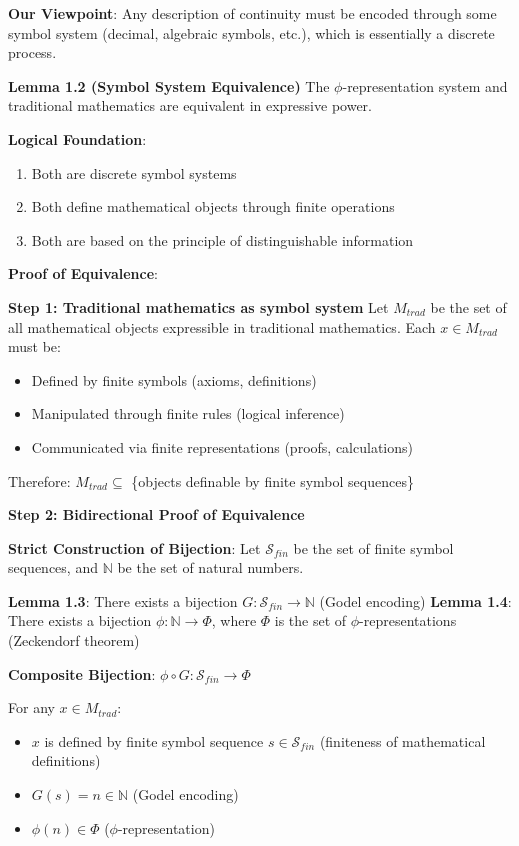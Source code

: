 \textbf{Our Viewpoint}: Any description of continuity must be encoded through some symbol system (decimal, algebraic symbols, etc.), which is essentially a discrete process.

\textbf{Lemma 1.2 (Symbol System Equivalence)}
\label{lem:1.2}
The $\phi$-representation system and traditional mathematics are equivalent in expressive power.

\textbf{Logical Foundation}:
\begin{enumerate}
\item Both are discrete symbol systems
\item Both define mathematical objects through finite operations
\item Both are based on the principle of distinguishable information
\end{enumerate}

\textbf{Proof of Equivalence}:

\textbf{Step 1: Traditional mathematics as symbol system}
Let $M_{trad}$ be the set of all mathematical objects expressible in traditional mathematics.
Each $x \in M_{trad}$ must be:
\begin{itemize}
\item Defined by finite symbols (axioms, definitions)
\item Manipulated through finite rules (logical inference)
\item Communicated via finite representations (proofs, calculations)
\end{itemize}

Therefore: $M_{trad} \subseteq$ \{objects definable by finite symbol sequences\}

\textbf{Step 2: Bidirectional Proof of Equivalence}

\textbf{Strict Construction of Bijection}:
Let $\mathcal{S}_{fin}$ be the set of finite symbol sequences, and $\mathbb{N}$ be the set of natural numbers.

\textbf{Lemma 1.3}: There exists a bijection $G: \mathcal{S}_{fin} \to \mathbb{N}$ (Godel encoding)
\label{lem:1.3}
\textbf{Lemma 1.4}: There exists a bijection $\phi: \mathbb{N} \to \Phi$, where $\Phi$ is the set of $\phi$-representations (Zeckendorf theorem)
\label{lem:1.4}

\textbf{Composite Bijection}: $\phi \circ G: \mathcal{S}_{fin} \to \Phi$

For any $x \in M_{trad}$:
\begin{itemize}
\item $x$ is defined by finite symbol sequence $s \in \mathcal{S}_{fin}$ (finiteness of mathematical definitions)
\item $G(s) = n \in \mathbb{N}$ (Godel encoding)
\item $\phi(n) \in \Phi$ ($\phi$-representation)
\end{itemize}

